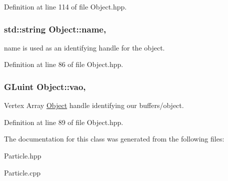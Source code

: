 Definition at line 114 of file Object.\-hpp.

\hypertarget{class_object_a24457e0a387492c80594aec7681a2277}{
\subsubsection[{name}]{\setlength{\rightskip}{0pt plus 5cm}std\-::string Object\-::name\hspace{0.3cm}{\ttfamily [protected]}, {\ttfamily [inherited]}}}\label{class_object_a24457e0a387492c80594aec7681a2277}


name is used as an identifying handle for the object. 



Definition at line 86 of file Object.\-hpp.

\hypertarget{class_object_a66190fee29d03d6478516686cbd01eb8}{
\subsubsection[{vao}]{\setlength{\rightskip}{0pt plus 5cm}G\-Luint Object\-::vao\hspace{0.3cm}{\ttfamily [protected]}, {\ttfamily [inherited]}}}\label{class_object_a66190fee29d03d6478516686cbd01eb8}


Vertex Array \hyperlink{class_object}{Object} handle identifying our buffers/object. 



Definition at line 89 of file Object.\-hpp.



The documentation for this class was generated from the following files\-:\begin{DoxyCompactItemize}
\item 
Particle.\-hpp\item 
Particle.\-cpp\end{DoxyCompactItemize}

